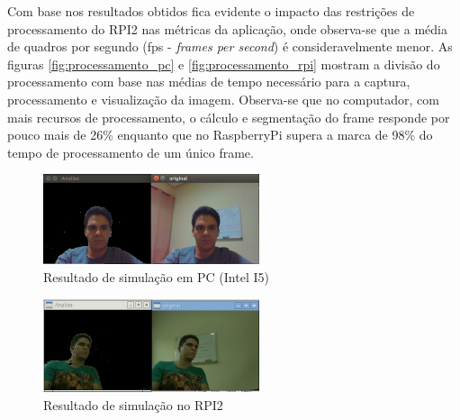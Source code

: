 \documentclass[conference]{IEEEtran}
\begin{document}
Com base nos resultados obtidos fica evidente o impacto das restrições de processamento do RPI2 nas métricas da aplicação, onde observa-se que a média de quadros por segundo (fps - \textit{frames per second}) é consideravelmente menor. As figuras \ref{fig:processamento_pc} e \ref{fig:processamento_rpi} mostram a divisão do processamento com base nas médias de tempo necessário para a captura, processamento e visualização da imagem. Observa-se que no computador, com mais recursos de processamento, o cálculo e segmentação do frame responde por pouco mais de 26\% enquanto que no RaspberryPi supera a marca de 98\% do tempo de processamento de um único frame.

\begin{figure}[!t]
\centering
\includegraphics[width=2.5in]{Screen_PC_01}
\caption{Resultado de simulação em PC (Intel I5)}
\label{fig:sim_pc}
\end{figure}

\begin{figure}[!t]
\centering
\includegraphics[width=2.5in]{Screen_RPI_01}
\caption{Resultado de simulação no RPI2}
\label{fig:sim_rpi}
\end{figure}


%
%

\end{document}
